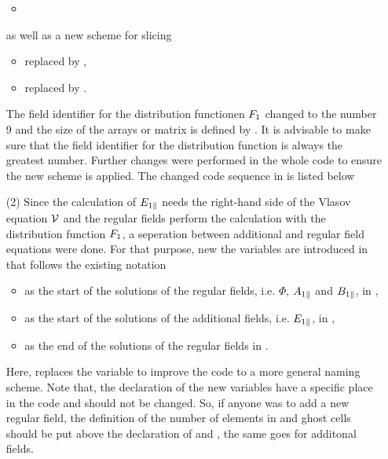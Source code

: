 \begin{enumerate}
\begin{itemize}
        \item {}
    \end{itemize}
    as well as a new scheme for slicing
    \begin{itemize}
        \item {} replaced by , 
        \item {} replaced by .
    \end{itemize}
    The field identifier for the distribution functionen $F_1$ changed to the number 9 and the size of the arrays or matrix is defined by . It is advisable to make sure that the field identifier for the distribution function is always the greatest number. Further changes were performed in the whole code to ensure the new scheme is applied. The changed code sequence in  is listed below
    \item[(2)] Since the calculation of $E_{1\parallel}$ needs the right-hand side of the Vlasov equation $\mathcal{V}$ and the regular fields perform the calculation with the distribution function $F_1$, a seperation between additional and regular field equations were done. For that purpose, new the variables are introduced in  that follows the existing notation 
    \begin{itemize}
        \item {} as the start of the solutions of the regular fields, i.e. $\Phi$, $A_{1\parallel}$ and $B_{1\parallel}$, in ,
        \item {} as the start of the solutions of the additional fields, i.e. $E_{1\parallel}$, in ,
        \item {} as the end of the solutions of the regular fields in .
    \end{itemize}
    Here,  replaces the variable  to improve the code to a more general naming scheme. Note that, the declaration of the new variables have a specific place in the code and should not be changed. So, if anyone was to add a new regular field, the definition of the number of elements in  and ghost cells should be put above the declaration of  and , the same goes for additonal fields. 

\end{enumerate}
